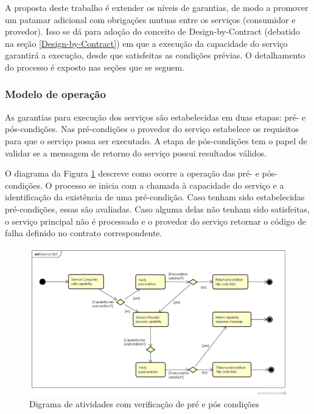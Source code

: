A proposta deste trabalho é extender os níveis de garantias, de modo a promover
um patamar adicional com obrigações mutuas entre os serviços (consumidor e
provedor). Isso se dá para adoção do conceito de Design-by-Contract (debatido
na seção \ref{Design-by-Contract}) em que a execução da
capacidade do serviço garantirá a execução, desde que satisfeitas as condições
prévias. O detalhamento do processo é exposto nas seções que se seguem.

\vspace{-6mm}

\subsubsection{Modelo de operação}
\vspace{-6mm}

As garantias para execução dos serviços são estabelecidas em duas etapas: pré- e
pós-condições. Nas pré-condições o provedor do serviço estabelece os requisitos
para que o serviço possa ser executado. A etapa de pós-condições tem o papel de
validar se a mensagem de retorno do serviço possui resultados válidos.

O diagrama da Figura \ref{FigServiceDbC} descreve como ocorre a operação das
pré- e pós-condições. O processo se inicia com a chamada à capacidade do serviço e a
identificação da existência de uma pré-condição. Caso tenham sido estabelecidas 
pré-condições, essas são avaliadas. Caso alguma delas não tenham sido
satisfeitas, o serviço principal não é processado e o provedor do serviço
retornar o código de falha definido no contrato correspondente.


\begin{figure}[!htb]
\centering
\includegraphics[width=\textwidth,trim = 0mm 5mm 0mm 0mm,clip]{ServiceDbC.png}
\caption{Digrama de atividades com verificação de pré e pós condições}
\label{FigServiceDbC}
\end{figure}

